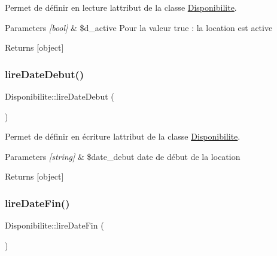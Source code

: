 Permet de définir en lecture l\textquotesingle{}attribut de la classe \hyperlink{class_disponibilite}{Disponibilite}. 


\begin{DoxyParams}{Parameters}
{\em \mbox{[}bool\mbox{]}} & \$d\+\_\+active Pour la valeur true \+: la location est active \\
\hline
\end{DoxyParams}
\begin{DoxyReturn}{Returns}
\mbox{[}object\mbox{]} 
\end{DoxyReturn}
\mbox{\label{class_disponibilite_a367f35c44bfb76cc57463a86c5009e24}} 
\subsubsection{\texorpdfstring{lire\+Date\+Debut()}{lireDateDebut()}}
{\footnotesize\ttfamily Disponibilite\+::lire\+Date\+Debut (\begin{DoxyParamCaption}{ }\end{DoxyParamCaption})}



Permet de définir en écriture l\textquotesingle{}attribut de la classe \hyperlink{class_disponibilite}{Disponibilite}. 


\begin{DoxyParams}{Parameters}
{\em \mbox{[}string\mbox{]}} & \$date\+\_\+debut date de début de la location \\
\hline
\end{DoxyParams}
\begin{DoxyReturn}{Returns}
\mbox{[}object\mbox{]} 
\end{DoxyReturn}
\mbox{\label{class_disponibilite_a6e4423f8f7aacf4eb33167d714a77d17}} 
\subsubsection{\texorpdfstring{lire\+Date\+Fin()}{lireDateFin()}}
{\footnotesize\ttfamily Disponibilite\+::lire\+Date\+Fin (\begin{DoxyParamCaption}{ }\end{DoxyParamCaption})}



